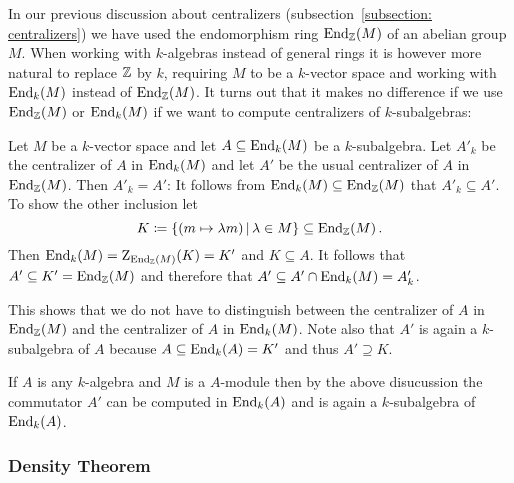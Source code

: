 \begin{fluff}
  In our previous discussion about centralizers (subsection~\ref{subsection: centralizers}) we have used the endomorphism ring $\operatorname{End}_{\mathbb{Z}}(M)$ of an abelian group $M$.
  When working with $k$-algebras instead of general rings it is however more natural to replace $\mathbb{Z}$ by $k$, requiring $M$ to be a $k$-vector space and working with $\operatorname{End}_k(M)$ instead of $\operatorname{End}_{\mathbb{Z}}(M)$.
  It turns out that it makes no difference if we use $\operatorname{End}_{\mathbb{Z}}(M)$ or $\operatorname{End}_k(M)$ if we want to compute centralizers of $k$-subalgebras:
  
  Let $M$ be a $k$-vector space and let $A \subseteq \operatorname{End}_k(M)$ be a $k$-subalgebra.
  Let $A'_k$ be the centralizer of $A$ in $\operatorname{End}_k(M)$ and let $A'$ be the usual centralizer of $A$ in $\operatorname{End}_{\mathbb{Z}}(M)$.
  Then $A'_k = A'$:
  It follows from $\operatorname{End}_k(M) \subseteq \operatorname{End}_{\mathbb{Z}}(M)$ that $A'_k \subseteq A'$.
  To show the other inclusion let
  \[
              K
    \defined  \{ (m \mapsto \lambda m) \suchthat \lambda \in M \}
    \subseteq \End_\Integer(M) \,.
  \]
  Then $\operatorname{End}_k(M) = \operatorname{Z}_{\operatorname{End}_{\mathbb{Z}}(M)}(K) = K'$ and $K \subseteq A$.
  It follows that $A' \subseteq K' = \operatorname{End}_{\mathbb{Z}}(M)$ and therefore that $A' \subseteq A' \cap \operatorname{End}_k(M) = A'_k$.
  
  This shows that we do not have to distinguish between the centralizer of $A$ in $\operatorname{End}_{\mathbb{Z}}(M)$ and the centralizer of $A$ in $\operatorname{End}_k(M)$.
  Note also that $A'$ is again a $k$-subalgebra of $A$ because $A \subseteq \operatorname{End}_k(A) = K'$ and thus $A' \supseteq K$.
  
  If $A$ is any $k$-algebra and $M$ is a $A$-module then by the above disucussion the commutator $A'$ can be computed in $\operatorname{End}_k(A)$ and is again a $k$-subalgebra of $\operatorname{End}_k(A)$.
\end{fluff}





\subsubsection{Density Theorem}


